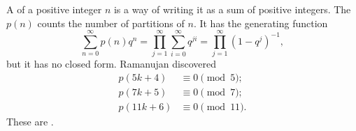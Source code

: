 \documentclass [preview, border = 20pt] {standalone}
\begin{document}
\pagecolor{black}
\color{white}
A  of a positive integer $n$ is a way of writing it as a sum of positive integers. The  $p(n)$ counts the number of partitions of $n$. It has the generating function
\[
\sum_{n=0}^\infty p(n)q^n = \prod_{j=1}^\infty \sum_{i=0}^\infty q^{ji} = \prod_{j=1}^\infty (1-q^j)^{-1},
\]
but it has no closed form. Ramanujan discovered
\begin{align*}
p(5k+4) &\equiv 0\pmod 5;\\
p(7k+5) &\equiv 0\pmod 7;\\
p(11k+6) &\equiv 0\pmod {11}.
\end{align*}
These are .
\end{document}
